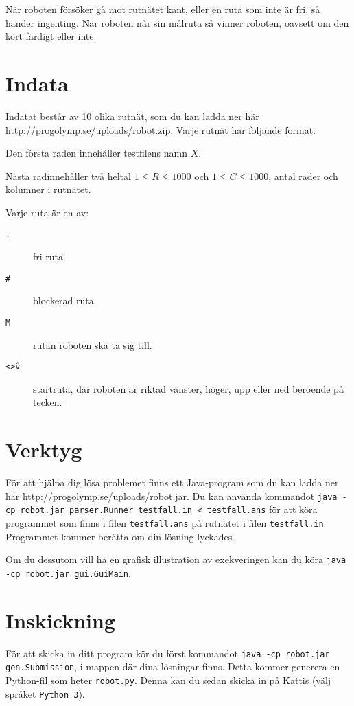 När roboten försöker gå mot rutnätet kant, eller en ruta som inte är fri, så händer ingenting. När roboten når sin målruta så vinner roboten, oavsett om den kört färdigt eller inte.

\section*{Indata}
Indatat består av 10 olika rutnät, som du kan ladda ner här \url{http://progolymp.se/uploads/robot.zip}. Varje rutnät har följande format:

Den första raden innehåller testfilens namn $X$.

Nästa radinnehåller två heltal $1 \le R \le 1000$ och $1 \le C \le 1000$, antal rader och kolumner i rutnätet.

Varje ruta är en av:
\begin{description}
  \item[\texttt{.}] fri ruta
  \item[\texttt{\#}] blockerad ruta
  \item[\texttt{M}] rutan roboten ska ta sig till.
  \item[\texttt{<>\^v}] startruta, där roboten är riktad vänster, höger, upp eller ned beroende på tecken.
\end{description}

\section*{Verktyg}
För att hjälpa dig lösa problemet finns ett Java-program som du kan ladda ner här \url{http://progolymp.se/uploads/robot.jar}. Du kan använda kommandot \texttt{java -cp robot.jar parser.Runner testfall.in < testfall.ans} för att köra programmet som finns i filen \texttt{testfall.ans} på rutnätet i filen \texttt{testfall.in}. Programmet kommer berätta om din lösning lyckades.

Om du dessutom vill ha en grafisk illustration av exekveringen kan du köra \texttt{java -cp robot.jar gui.GuiMain}.

\section*{Inskickning}
För att skicka in ditt program kör du först kommandot \texttt{java -cp robot.jar gen.Submission}, i mappen där dina lösningar finns. Detta kommer generera en Python-fil som heter \texttt{robot.py}. Denna kan du sedan skicka in på Kattis (välj språket \texttt{Python 3}).

